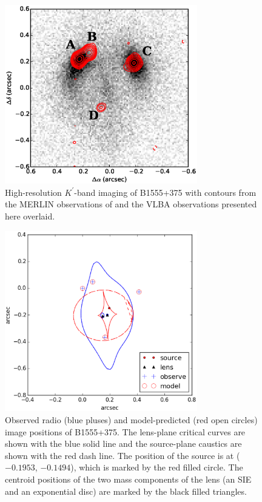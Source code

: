 \documentclass[a4paper,fleqn,usenatbib,useAMS]{mnras}
\begin{document}
\begin{figure}
\includegraphics[width=84mm]{1555_ao_merlin_overlay.eps}
\caption{High-resolution $K^\prime$-band imaging of B1555+375 with contours from the MERLIN observations of \citet{Marlow99} and the VLBA observations presented here overlaid.}
\label{fig:merlin}
\end{figure}

\begin{figure}
\includegraphics[width=84mm]{gravlens_exp_try5_plot.eps}
\caption{Observed radio (blue pluses) and model-predicted (red open circles) image positions of B1555+375. The lens-plane critical curves are shown with the blue solid line and the source-plane caustics are shown with the red dash line. The position of the source is at ($-0.1953$, $-0.1494$), which is marked by the red filled circle. The centroid positions of the two mass components of the lens (an SIE and an exponential disc) are marked by the black filled triangles.}
\label{fig:model}
\end{figure}
\end{document}
